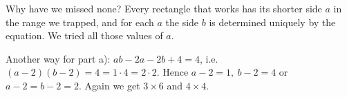 {\begin{proofbox}Why have we missed none? Every rectangle that works has its shorter side $a$ in the range we
trapped, and for each $a$ the side $b$ is determined uniquely by the equation. We tried all those values of
$a$.\end{proofbox}
\begin{tipbox}Another way for part a): $ab-2a-2b+4=4$, i.e.\ $(a-2)(b-2)=4=1\cdot 4=2\cdot 2$. Hence
$a-2=1,\ b-2=4$ or $a-2=b-2=2$. Again we get $3\times 6$ and $4\times 4$.\end{tipbox}
}

